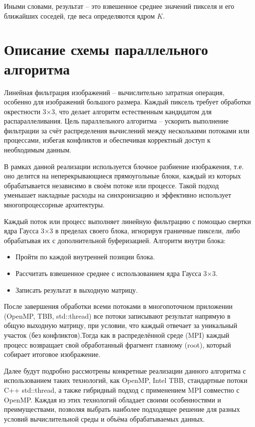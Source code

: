 \documentclass[14pt, a4paper]{extarticle}
\begin{document}
Иными словами, результат – это взвешенное среднее значений пикселя и его ближайших соседей, где веса определяются ядром $K$.

\newpage

\section{Описание схемы параллельного алгоритма}
Линейная фильтрация изображений – вычислительно затратная операция, особенно для изображений большого размера. Каждый пиксель требует обработки окрестности 3×3, что делает алгоритм естественным кандидатом для распараллеливания. Цель параллельного алгоритма – ускорить выполнение фильтрации за счёт распределения вычислений между несколькими потоками или процессами, избегая конфликтов и обеспечивая корректный доступ к необходимым данным.

В рамках данной реализации используется блочное разбиение изображения, т.е. оно делится на неперекрывающиеся прямоугольные блоки, каждый из которых обрабатывается независимо в своём потоке или процессе. Такой подход уменьшает накладные расходы на синхронизацию и эффективно использует многопроцессорные архитектуры.

Каждый поток или процесс выполняет линейную фильтрацию с помощью свертки ядра Гаусса 3×3 в пределах своего блока, игнорируя граничные пиксели, либо обрабатывая их с дополнительной буферизацией. Алгоритм внутри блока:

\begin{itemize}
  \item Пройти по каждой внутренней позиции блока.
  \item Рассчитать взвешенное среднее с использованием ядра Гаусса 3×3.
  \item Записать результат в выходную матрицу.
\end{itemize}

После завершения обработки всеми потоками в многопоточном приложении (OpenMP,  TBB, std::thread) все потоки записывают результат напрямую в общую выходную матрицу, при условии, что каждый отвечает за уникальный участок (без конфликтов).Тогда как в распределённой среде (MPI) каждый процесс возвращает свой обработанный фрагмент главному (root), который собирает итоговое изображение.

Далее будут подробно рассмотрены конкретные реализации данного алгоритма с использованием таких технологий, как OpenMP, Intel TBB, стандартные потоки C++ std::thread, а также гибридный подход с применением MPI совместно с OpenMP. Каждая из этих технологий обладает своими особенностями и преимуществами, позволяя выбрать наиболее подходящее решение для разных условий вычислительной среды и объёма обрабатываемых данных.
\end{document}
